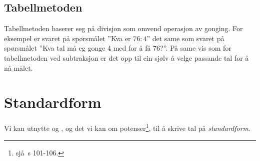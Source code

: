 \subsection{Tabellmetoden}
Tabellmetoden baserer seg på divisjon som omvend operasjon av gonging. For eksempel er svaret på spørsmålet ''Kva er $ {76:4} $'' det same som svaret på spørsmålet ''Kva tal må eg gonge 4 med for å få 76?''. På same vis som for tabellmetoden ved subtraksjon er det opp til ein sjølv å velge passande tal for å nå målet.
\begin{center}
	\parbox{0.35\linewidth}{
		} \qquad
\parbox{0.35\linewidth}{
	} \vsk

\parbox{0.415\linewidth}{
}
\end{center}
\section{Standardform}
Vi kan utnytte  og , og det vi kan om potenser\footnote{sjå \mb\,s 101-106.}, til å skrive tal på \textit{standardform}. \vsk

